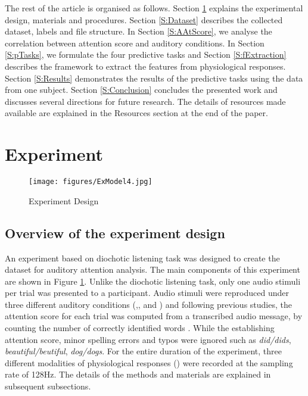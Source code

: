 \documentclass{article}
\begin{document}
The rest of the article is organised as follows. Section \ref{S:Exp} explains the experimental design, materials and procedures. Section \ref{S:Dataset} describes the collected dataset, labels and file structure. In Section \ref{S:AAtScore}, we analyse the correlation between attention score and auditory conditions. In Section \ref{S:pTasks}, we formulate the four predictive tasks and Section \ref{S:fExtraction} describes the framework to extract the features from physiological responses. Section \ref{S:Results} demonstrates the results of the predictive tasks using the data from one subject. Section \ref{S:Conclusion} concludes the presented work and discusses several directions for future research. The details of resources made available are explained in the Resources section at the end of the paper. 



\section{Experiment}\label{S:Exp}
\begin{figure}[t]
    \centering
    \texttt{[image: figures/ExModel4.jpg]}
    \caption{Experiment Design}
    \label{fig:ED}
\end{figure}

\subsection{Overview of the experiment design}
\label{ss:ExDesign}


An experiment based on diochotic listening task was designed to create the dataset for auditory attention analysis. The main components of this experiment are shown in Figure \ref{fig:ED}. Unlike the diochotic listening task, only one audio stimuli per trial was presented to a participant. Audio stimuli were reproduced under three different auditory conditions (,, and ) and following previous studies, the attention score  for each trial was computed from a transcribed audio message, by counting the number of correctly identified words \cite{auralPerception1967, dichoticTask1987, dichoticTask2007, dichoticTask2003}. While the establishing attention score, minor spelling errors and typos were ignored such as {\it did/dids}, {\it beautiful/beutiful}, {\it dog/dogs}. For the entire duration of the experiment, three different modalities of physiological responses () were recorded at the sampling rate of 128Hz. The details of the methods and materials are explained in subsequent subsections.
\end{document}
